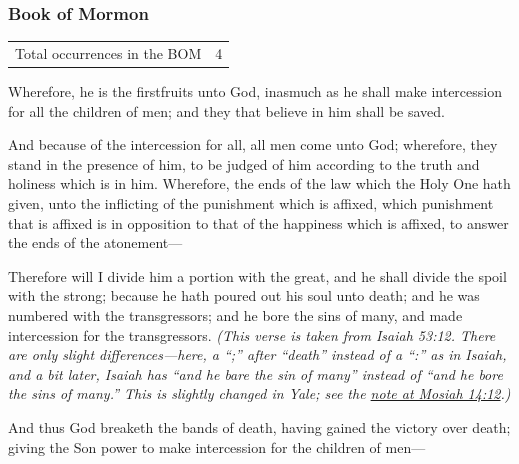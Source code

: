 				\begin{compactdesc}
					\item[Some NT uses] \textbf{}
						\begin{compactdesc}
							\item[1 Timothy 2:1] 
							\item[1 Timothy 4:5] 
						\end{compactdesc}
				\end{compactdesc}
		
	\subsubsection{Book of Mormon} %
		\label{INTERCESSION-BOM}
	
		\begin{tabular}{ll}
			Total occurrences in the BOM & 4
		\end{tabular}
		
		\begin{compactdesc}
			\item[2 Nephi 2:9] Wherefore, he is the firstfruits unto God, inasmuch as he shall make intercession for all the children of men; and they that believe in him shall be saved.
			\item[2 Nephi 2:10] And because of the intercession for all, all men come unto God; wherefore, they stand in the presence of him, to be judged of him according to the truth and holiness which is in him.  Wherefore, the ends of the law which the Holy One hath given, unto the inflicting of the punishment which is affixed, which punishment that is affixed is in opposition to that of the happiness which is affixed, to answer the ends of the atonement---
			\item[Mosiah 14:12] Therefore will I divide him a portion with the great, and he shall divide the spoil with the strong; because he hath poured out his soul unto death; and he was numbered with the transgressors; and he bore the sins of many, and made intercession for the transgressors. \textit{(This verse is taken from Isaiah 53:12. There are only slight differences---here, a ``;'' after ``death'' instead of a ``:'' as in Isaiah, and a bit later, Isaiah has ``and he bare the sin of many'' instead of ``and he bore the sins of many.'' This is slightly changed in Yale; see the \hyperref[MOSIAH-14-12-NOTE-VERSIONS]{note at Mosiah 14:12}.)}
			\item[Mosiah 15:8] And thus God breaketh the bands of death, having gained the victory over death; giving the Son power to make intercession for the children of men---
		\end{compactdesc}
		
